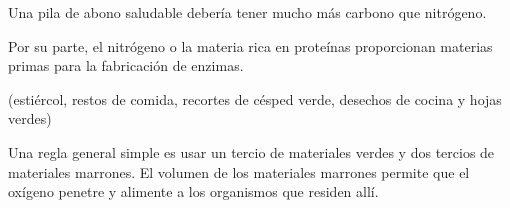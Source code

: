 \documentclass[../main.tex]{subfiles}
\begin{document}
\begin{table}[H]
    \centering\sffamily
    {%
    \def\arraystretch{1.5}%
    \caption*{\sffamily\color{CompostGreen!50!black}Ejemplos de materia rica en carbono}
    }
    \label{carbono1}
\end{table}%

\begin{recuadroR}
    Una pila de abono saludable debería tener mucho más carbono que nitrógeno.
\end{recuadroR}

Por su parte, el nitrógeno o la materia rica en proteínas proporcionan materias primas para la fabricación de enzimas.

(estiércol, restos de comida, recortes de césped verde, desechos de cocina y hojas verdes) 

\begin{table}[H]
    \centering\sffamily
    {%
    \def\arraystretch{1.5}%
    \caption*{\sffamily\color{CompostGreen!50!black}Ejemplos de materia rica en nitrógeno}
    }
    \label{carbono1}
\end{table}%

\begin{recuadroV}
    Una regla general simple es usar un tercio de materiales verdes y dos tercios de materiales marrones. El volumen de los materiales marrones permite que el oxígeno penetre y alimente a los organismos que residen allí.
\end{recuadroV}
\end{document}
